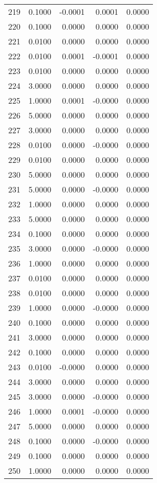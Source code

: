 \begin{longtable}{lrrrr}
219 & 0.1000 & -0.0001 & 0.0001 & 0.0000 \\
220 & 0.1000 & 0.0000 & 0.0000 & 0.0000 \\
221 & 0.0100 & 0.0000 & 0.0000 & 0.0000 \\
222 & 0.0100 & 0.0001 & -0.0001 & 0.0000 \\
223 & 0.0100 & 0.0000 & 0.0000 & 0.0000 \\
224 & 3.0000 & 0.0000 & 0.0000 & 0.0000 \\
225 & 1.0000 & 0.0001 & -0.0000 & 0.0000 \\
226 & 5.0000 & 0.0000 & 0.0000 & 0.0000 \\
227 & 3.0000 & 0.0000 & 0.0000 & 0.0000 \\
228 & 0.0100 & 0.0000 & -0.0000 & 0.0000 \\
229 & 0.0100 & 0.0000 & 0.0000 & 0.0000 \\
230 & 5.0000 & 0.0000 & 0.0000 & 0.0000 \\
231 & 5.0000 & 0.0000 & -0.0000 & 0.0000 \\
232 & 1.0000 & 0.0000 & 0.0000 & 0.0000 \\
233 & 5.0000 & 0.0000 & 0.0000 & 0.0000 \\
234 & 0.1000 & 0.0000 & 0.0000 & 0.0000 \\
235 & 3.0000 & 0.0000 & -0.0000 & 0.0000 \\
236 & 1.0000 & 0.0000 & 0.0000 & 0.0000 \\
237 & 0.0100 & 0.0000 & 0.0000 & 0.0000 \\
238 & 0.0100 & 0.0000 & 0.0000 & 0.0000 \\
239 & 1.0000 & 0.0000 & -0.0000 & 0.0000 \\
240 & 0.1000 & 0.0000 & 0.0000 & 0.0000 \\
241 & 3.0000 & 0.0000 & 0.0000 & 0.0000 \\
242 & 0.1000 & 0.0000 & 0.0000 & 0.0000 \\
243 & 0.0100 & -0.0000 & 0.0000 & 0.0000 \\
244 & 3.0000 & 0.0000 & 0.0000 & 0.0000 \\
245 & 3.0000 & 0.0000 & -0.0000 & 0.0000 \\
246 & 1.0000 & 0.0001 & -0.0000 & 0.0000 \\
247 & 5.0000 & 0.0000 & 0.0000 & 0.0000 \\
248 & 0.1000 & 0.0000 & -0.0000 & 0.0000 \\
249 & 0.1000 & 0.0000 & 0.0000 & 0.0000 \\
250 & 1.0000 & 0.0000 & 0.0000 & 0.0000 \\

\end{longtable}
